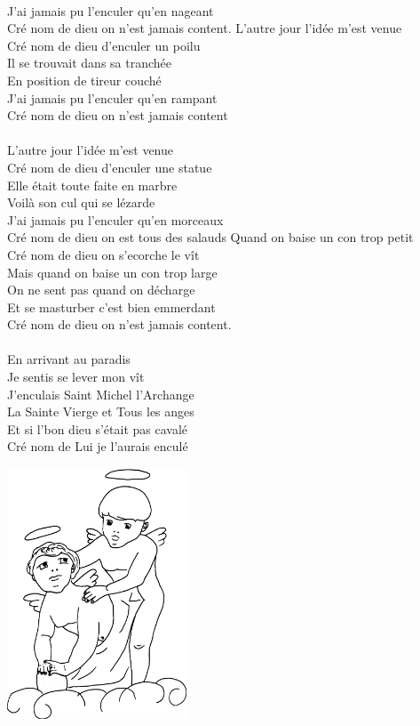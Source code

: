 \\J'ai jamais pu l'enculer qu'en nageant
\\Cré nom de dieu on n'est jamais content.
\breakpage
L'autre jour l'idée m'est venue
\\Cré nom de dieu d'enculer un poilu
\\Il se trouvait dans sa tranchée
\\En position de tireur couché
\\J'ai jamais pu l'enculer qu'en rampant
\\Cré nom de dieu on n'est jamais content
\\\\L'autre jour l'idée m'est venue
\\Cré nom de dieu d'enculer une statue
\\Elle était toute faite en marbre
\\Voilà son cul qui se lézarde
\\J'ai jamais pu l'enculer qu'en morceaux
\\Cré nom de dieu on est tous des salauds
Quand on baise un con trop petit
\\Cré nom de dieu on s'ecorche le vît
\\Mais quand on baise un con trop large
\\On ne sent pas quand on décharge
\\Et se masturber c'est bien emmerdant
\\Cré nom de dieu on n'est jamais content.
\\\\En arrivant au paradis
\\Je sentis se lever mon vît
\\J'enculais Saint Michel l'Archange
\\La Sainte Vierge et Tous les anges
\\Et si l'bon dieu s'était pas cavalé
\\Cré nom de Lui je l'aurais enculé
\begin{center}
\includegraphics[width=0.4\textwidth]{images/femme_vidangeur.jpg}
\end{center}

\breakpage